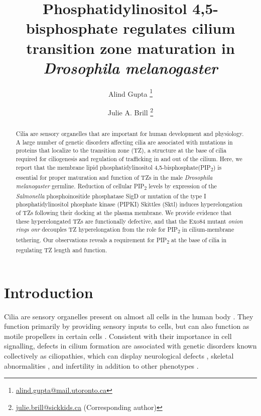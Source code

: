 \documentclass[12pt, twoside, letterpaper]{article}
\title{\bfseries\large Phosphatidylinositol 4,5-bisphosphate regulates cilium transition zone maturation in \textit{Drosophila melanogaster}}
\author[1,2]{Alind Gupta \thanks{\url{alind.gupta@mail.utoronto.ca}}}
\author[1,2]{Julie A. Brill \thanks{\url{julie.brill@sickkids.ca} (Corresponding author)}}
\affil[1]{\small Department of Molecular Genetics, University of Toronto, Toronto, ON M5S 1A8, Canada}
\affil[2]{\small Program in Cell Biology, Hospital for Sick Children, Toronto, ON M5G 1X8, Canada}
\date{}
\newcommand{\PIP}{PIP\textsubscript{2}}
\begin{document}
\maketitle
\raggedright

\begin{abstract}
  \vspace*{-0.7em}
  Cilia are sensory organelles that are important for human development
  and physiology.
  A large number of genetic disorders affecting cilia are associated with
  mutations in proteins that localize to the transition zone (TZ),
  a structure at the base of cilia required for ciliogenesis and
  regulation of trafficking in and out of the cilium.
  Here, we report that the membrane lipid phosphatidylinositol
  4,5-bisphosphate(\PIP{}) is essential for proper maturation and function
  of TZs in the male \textit{Drosophila melanogaster} germline.
  Reduction of cellular \PIP{} levels by expression of the
  \textit{Salmonella} phosphoinositide phosphatase SigD or mutation of
  the type I phosphatidylinositol phosphate kinase (PIPKI) Skittles (Sktl)
  induces hyperelongation of TZs following their docking at the plasma
  membrane.
  We provide evidence that these hyperelongated TZs are functionally
  defective, and that the Exo84 mutant \textit{onion rings}
  \textit{onr} decouples TZ hyperelongation from the role for
  \PIP{} in cilium-membrane tethering.
  Our observations reveals a requirement for \PIP{} at the base of cilia
  in regulating TZ length and function.
\end{abstract}


\section{Introduction}
Cilia are sensory organelles present on almost all cells in the human body
\citep{satir2010primary}.
They function primarily by providing sensory inputs to cells, but can
also function as motile propellers in certain cells
\citep{bloodgood2010sensory}.
Consistent with their importance in cell signalling,
defects in cilium formation are associated with genetic disorders
known collectively as ciliopathies, which can display
neurological defects \citep{valente2014primary},
skeletal abnormalities \citep{hammarsjo2017novel},
and infertility \citep{inaba2016sperm} in addition to other phenotypes
\citep{waters2011ciliopathies}.
\end{document}
